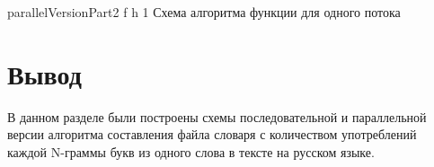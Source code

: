 {parallelVersionPart2} %
{f} %
{h} %
{1\textwidth} %
{Схема алгоритма функции для одного потока} %


\clearpage

\section*{Вывод}

В данном разделе были построены схемы последовательной и параллельной версии алгоритма составления файла словаря с количеством употреблений каждой N-граммы букв из одного слова в тексте на русском языке.




